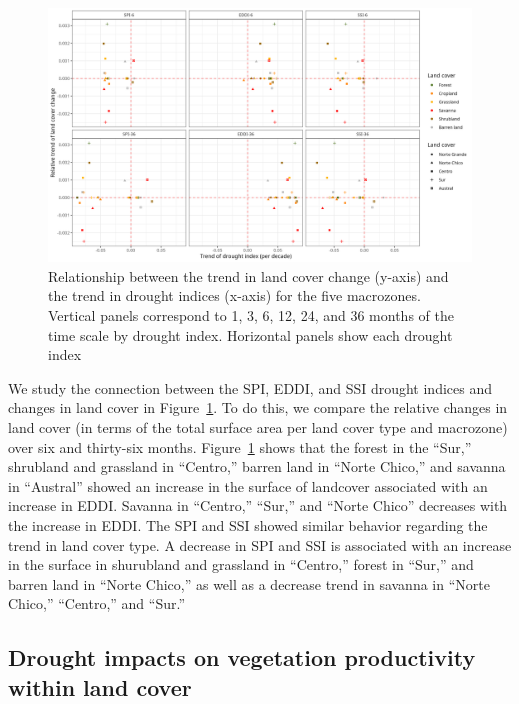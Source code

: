 \documentclass[
  authoryear,
  preprint,
  3p,
  onecolumn]{elsarticle}
\begin{document}
\begin{figure}[!ht]

{\centering \includegraphics{../output/figs/points_landcover_drought_indices_trend_and_time_scale.png}

}

\caption{\label{fig-TrendsLandDrought}Relationship between the trend in
land cover change (y-axis) and the trend in drought indices (x-axis) for
the five macrozones. Vertical panels correspond to 1, 3, 6, 12, 24, and
36 months of the time scale by drought index. Horizontal panels show
each drought index}

\end{figure}

We study the connection between the SPI, EDDI, and SSI drought indices
and changes in land cover in Figure~\ref{fig-TrendsLandDrought}. To do
this, we compare the relative changes in land cover (in terms of the
total surface area per land cover type and macrozone) over six and
thirty-six months. Figure~\ref{fig-TrendsLandDrought} shows that the
forest in the ``Sur,'' shrubland and grassland in ``Centro,'' barren
land in ``Norte Chico,'' and savanna in ``Austral'' showed an increase
in the surface of landcover associated with an increase in EDDI. Savanna
in ``Centro,'' ``Sur,'' and ``Norte Chico'' decreases with the increase
in EDDI. The SPI and SSI showed similar behavior regarding the trend in
land cover type. A decrease in SPI and SSI is associated with an
increase in the surface in shurubland and grassland in ``Centro,''
forest in ``Sur,'' and barren land in ``Norte Chico,'' as well as a
decrease trend in savanna in ``Norte Chico,'' ``Centro,'' and ``Sur.''

\hypertarget{drought-impacts-on-vegetation-productivity-within-land-cover}{%
\subsection{Drought impacts on vegetation productivity within land
cover}\label{drought-impacts-on-vegetation-productivity-within-land-cover}}
\end{document}
